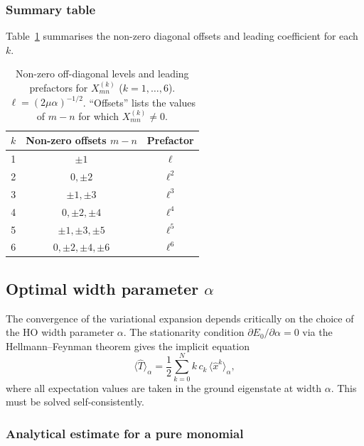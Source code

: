 \subsubsection{Summary table}

Table~\ref{tab:Xk_bandwidth} summarises the non-zero diagonal offsets and
leading coefficient for each $k$.

\begin{table}[htbp]
  \centering
  \caption{%
    Non-zero off-diagonal levels and leading prefactors for
    $X^{(k)}_{mn}$ ($k=1,\ldots,6$).
    $\ell=(2\mu\alpha)^{-1/2}$.
    ``Offsets'' lists the values of $m-n$ for which $X^{(k)}_{mn}\neq 0$.%
  }
  \label{tab:Xk_bandwidth}
  \begin{tabular}{ccc}
    \toprule
    $k$ & Non-zero offsets $m-n$ & Prefactor \\
    \midrule
    1 & $\pm 1$ & $\ell$ \\
    2 & $0, \pm 2$ & $\ell^2$ \\
    3 & $\pm 1, \pm 3$ & $\ell^3$ \\
    4 & $0, \pm 2, \pm 4$ & $\ell^4$ \\
    5 & $\pm 1, \pm 3, \pm 5$ & $\ell^5$ \\
    6 & $0, \pm 2, \pm 4, \pm 6$ & $\ell^6$ \\
    \bottomrule
  \end{tabular}
\end{table}

\subsection{Optimal width parameter \texorpdfstring{$\alpha$}{alpha}}\label{sec:opt_alpha}

The convergence of the variational expansion depends critically on the choice
of the HO width parameter $\alpha$.  The stationarity condition
$\partial E_0/\partial\alpha = 0$ via the Hellmann--Feynman theorem gives the
implicit equation
\begin{equation}\label{eq:opt_alpha_general}
  \langle\hat T\rangle_\alpha = \frac{1}{2}\sum_{k=0}^{N} k\,c_k\,
  \langle\hat x^k\rangle_\alpha,
\end{equation}
where all expectation values are taken in the ground eigenstate at width
$\alpha$.  This must be solved self-consistently.

\subsubsection{Analytical estimate for a pure monomial}

